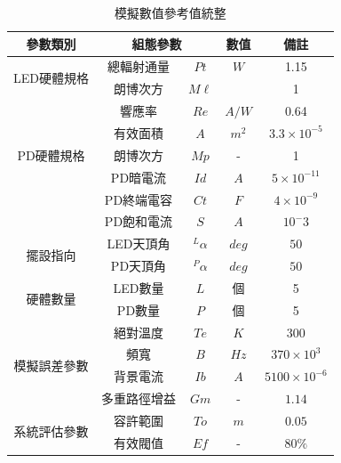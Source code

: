 \begin{table}[htpb]
    \begin{center}
      \caption{模擬數值參考值統整}
      \label{tab:para_reference}
      \begin{tabular}{|c|cc|c|c|} %
        \hline
        \textbf{參數類別}&\multicolumn{2}{|c|}{\textbf{組態參數}}  &\textbf{數值}  &  \textbf{備註}   \\
        \hline
        \multirow{2}{*}{LED硬體規格}
        & 總輻射通量 &$Pt$ & $W$ & 1.15\\
        &朗博次方& $M\ell$& &1 \\
        \hline

        \multirow{5}{*}{PD硬體規格}
        &響應率 &$Re$ & $A/W$ & 0.64\\
        &有效面積& $A$& $m^2$ &$3.3\times 10^{-5}$\\
        &朗博次方& $Mp$& - &1\\
        &PD暗電流 &$Id$ & $A$& $5\times 10^{-11}$\\
        &PD終端電容 &$Ct$ & $F$ &$4\times 10^{-9}$\\
        &PD飽和電流& $S$ &$A$&$10^-3$\\
        \hline

        \multirow{2}{*}{擺設指向}
        &LED天頂角 &$^L \alpha$ & $deg$&$50$\\
        &PD天頂角 &$^P \alpha$ & $deg$&$50$\\
        \hline

        \multirow{2}{*}{硬體數量}
        &LED數量 &$L$ & 個&5\\
        &PD數量 &$P$ & 個&5\\
        \hline

        \multirow{4}{*}{模擬誤差參數}
        &絕對溫度 &$Te$ & $K$ &  $300$\\
        &頻寬 &$B$ & $Hz$ &  $370\times 10^{3}$\\
        &背景電流&$Ib$&$A$&$5100\times 10^{-6}$\\
        &多重路徑增益&$Gm$&-&$1.14$\\
        \hline

        \multirow{2}{*}{系統評估參數}
        &容許範圍&$To$&$m$&$0.05$\\
        &有效閥值&$Ef$&-&$80\%$\\
        \hline


      \end{tabular}
    \end{center}
  \end{table}

